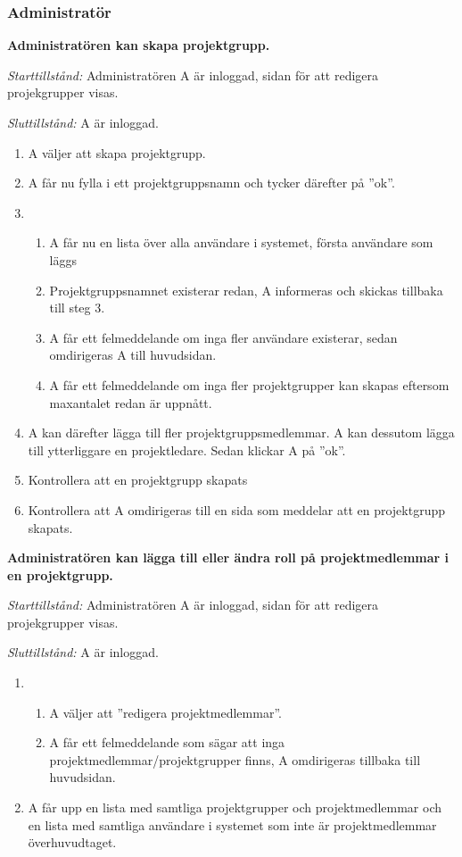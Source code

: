 \documentclass[a4paper]{article}
\begin{document}
\subsubsection{Administratör}

\begin{ST}

\item
\textbf{Administratören kan skapa projektgrupp.}

\emph{Starttillstånd:} Administratören A är inloggad, sidan för att redigera projekgrupper visas.

\emph{Sluttillstånd:} A är inloggad.

\begin{enumerate}
\item A väljer att skapa projektgrupp.
\item A får nu fylla i ett projektgruppsnamn och tycker därefter på ''ok''.
\item 
\begin{enumerate}
\item A får nu en lista över alla användare i systemet, första användare som läggs %
\item Projektgruppsnamnet existerar redan, A informeras och skickas tillbaka till steg 3.
\item A får ett felmeddelande om inga fler användare existerar, sedan omdirigeras A till huvudsidan.
\item A får ett felmeddelande om inga fler projektgrupper kan skapas eftersom maxantalet redan är uppnått.
\end{enumerate}
\item A kan därefter lägga till fler projektgruppsmedlemmar. A kan dessutom lägga till ytterliggare en projektledare. Sedan klickar A på ''ok''.
\item Kontrollera att en projektgrupp skapats
\item Kontrollera att A omdirigeras till en sida som meddelar att en projektgrupp skapats.
\end{enumerate}

\item
\textbf{Administratören kan lägga till eller ändra roll på projektmedlemmar i en projektgrupp.}

\emph{Starttillstånd:} Administratören A är inloggad, sidan för att redigera projekgrupper visas.

\emph{Sluttillstånd:} A är inloggad.

\begin{enumerate}
\item 
\begin{enumerate}
\item A väljer att ''redigera projektmedlemmar''.
\item A får ett felmeddelande som sägar att inga projektmedlemmar/projektgrupper finns, A omdirigeras tillbaka till huvudsidan.
\end{enumerate}
\item A får upp en lista med samtliga projektgrupper och projektmedlemmar och en lista med samtliga användare i systemet som inte är projektmedlemmar överhuvudtaget.


\end{enumerate}
\end{ST}
\end{document}
